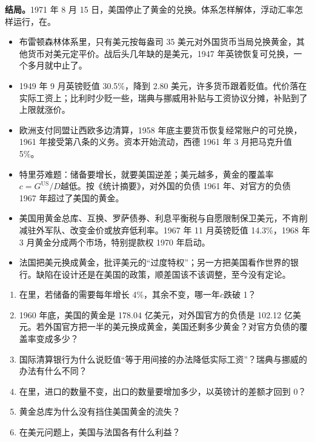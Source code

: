 \textbf{结局。}1971 年 8 月 15 日，美国停止了黄金的兑换\cite{bordo1993}。体系怎样解体，浮动汇率怎样运行，在。

\begin{takeaways}
\begin{itemize}
\item 布雷顿森林体系里，只有美元按每盎司 35 美元对外国货币当局兑换黄金，其他货币对美元定平价。战后头几年缺的是美元，1947 年英镑恢复可兑换，一个多月就中止了。
\item 1949 年 9 月英镑贬值 30.5\%，降到 2.80 美元，许多货币跟着贬值。代价落在实际工资上；比利时少贬一些，瑞典与挪威用补贴与工资协议分摊，补贴到了上限就涨价。
\item 欧洲支付同盟让西欧多边清算，1958 年底主要货币恢复经常账户的可兑换，1961 年接受第八条的义务。资本开始流动，西德 1961 年 3 月把马克升值 5\%。
\item 特里芬难题：储备要增长，就要美国逆差；美元越多，黄金的覆盖率$c=G^{\mathrm{US}}/D$越低。按《统计摘要》，对外国的负债 1961 年、对官方的负债 1967 年超过了美国的黄金。
\item 美国用黄金总库、互换、罗萨债券、利息平衡税与自愿限制保卫美元，不肯削减驻外军队、改变金价或放弃低利率。1967 年 11 月英镑贬值 14.3\%，1968 年 3 月黄金分成两个市场，特别提款权 1970 年启动。
\item 法国把美元换成黄金，批评美元的“过度特权”；另一方把美国看作世界的银行。缺陷在设计还是在美国的政策，顺差国该不该调整，至今没有定论。
\end{itemize}
\end{takeaways}

\begin{selfcheck}
\begin{enumerate}
\item 在里，若储备的需要每年增长 4\%，其余不变，哪一年$c$跌破 1？
\item 1960 年底，美国的黄金是 178.04 亿美元，对外国官方的负债是 102.12 亿美元。若外国官方把一半的美元换成黄金，美国还剩多少黄金？对官方负债的覆盖率变成多少？
\item 国际清算银行为什么说贬值“等于用间接的办法降低实际工资”？瑞典与挪威的办法有什么不同？
\item 在里，进口的数量不变，出口的数量要增加多少，以英镑计的差额才回到 0？
\item 黄金总库为什么没有挡住美国黄金的流失？
\item 在美元问题上，美国与法国各有什么利益？
\end{enumerate}
\end{selfcheck}

